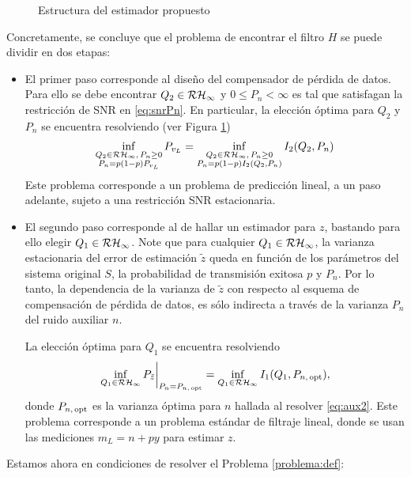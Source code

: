 \begin{figure}[htbp]
\centering
\scalebox{1.3}{}
\caption{Estructura del estimador propuesto}
\label{fig:clave}
\end{figure}
Concretamente, se concluye que el problema de encontrar el filtro $H$ se puede dividir en dos etapas:
\begin{itemize}
\item El primer paso corresponde al dise\~no del compensador de p\'erdida de datos. Para ello se debe encontrar $Q_2\in \cal{RH}_{\infty}$ y $0\leq P_n<\infty$ es tal que satisfagan la restricci\'on de SNR en \eqref{eq:snrPn}. En particular, la elecci\'on \'optima para $Q_2$ y $P_n$ se encuentra resolviendo (ver Figura \ref{fig:clave})
\begin{align}\label{eq:aux2}
\inf_{ \substack{ Q_2\in\cal{RH}_{\infty}, \, P_n\geq 0 \\ P_n=p(1-p)P_{v_L} } } P_{v_L}
= \inf_{ \substack{ Q_2\in\cal{RH}_{\infty}, \, P_n\geq 0 \\ P_n=p(1-p)I_2\left(Q_2,P_n\right) } } I_2(Q_2, P_n)
\end{align}
Este problema corresponde a un problema de predicci\'on lineal, a un paso adelante, sujeto a una restricci\'on SNR estacionaria.
\item El segundo paso corresponde al de hallar un estimador para $z$, bastando para ello elegir $Q_1\in \cal{RH}_{\infty}$. Note que para cualquier $Q_1 \in \cal{RH}_{\infty}$, la varianza estacionaria del error de estimaci\'on $\tilde{z}$ queda en funci\'on de los par\'ametros del sistema original $S$, la probabilidad de transmisi\'on exitosa $p$ y $P_n$. Por lo tanto, la dependencia de la varianza de $\tilde{z}$ con respecto al esquema de compensaci\'on de p\'erdida de datos, es s\'olo indirecta a trav\'es de la varianza $P_n$ del ruido auxiliar $n$.

La elecci\'on \'optima para $Q_1$ se encuentra resolviendo
\begin{align}\label{eq:Q1demoaux}
\left. \inf_{Q_1\in\cal{RH}_{\infty}} P_{\tilde{z}} \right|_{P_n=P_{n, \, \opt}} = \inf_{Q_1\in\cal{RH}_{\infty}} I_1(Q_1, P_{n, \, \opt}),
\end{align}
donde $P_{n,\,\opt}$ es la varianza \'optima para $n$ hallada al resolver \eqref{eq:aux2}. Este problema corresponde a un problema est\'andar de filtraje lineal, donde se usan las mediciones $m_L=n+py$ para estimar $z$.
\end{itemize}
\newpage
Estamos ahora en condiciones de resolver el Problema \ref{problema:def}:
